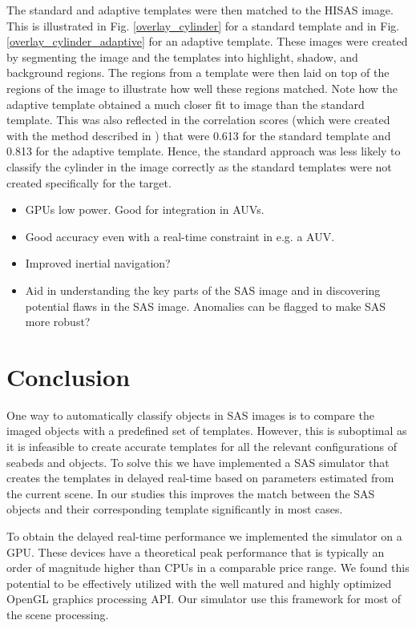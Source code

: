 The standard and adaptive templates were then matched to the HISAS image. This is illustrated in Fig. \ref{overlay_cylinder} for a standard template and in Fig. \ref{overlay_cylinder_adaptive} for an adaptive template. These images were created by segmenting the image and the templates into highlight, shadow, and background regions. The regions from a template were then laid on top of the regions of the image to illustrate how well these regions matched. Note how the adaptive template obtained a much closer fit to image than the standard template. This was also reflected in the correlation scores (which were created with the method described in \cite{Midelfart2010}) that were 0.613 for the standard template and 0.813 for the adaptive template. Hence, the standard approach was less likely to classify the cylinder in the image correctly as the standard templates were not created specifically for the target.

\begin{itemize}
\item GPUs low power. Good for integration in AUVs.
\item Good accuracy even with a real-time constraint in e.g. a AUV.
\item Improved inertial navigation?
\item Aid in understanding the key parts of the SAS image and in discovering potential flaws in the SAS image. Anomalies can be flagged to make SAS more robust?
\end{itemize}


\section{Conclusion}\label{conclusion}

One way to automatically classify objects in SAS images is to compare the imaged objects with a predefined set of templates. However, this is suboptimal as it is infeasible to create accurate templates for all the relevant configurations of seabeds and objects. To solve this we have implemented a SAS simulator that creates the templates in delayed real-time based on parameters estimated from the current scene. In our studies this improves the match between the SAS objects and their corresponding template significantly in most cases.

To obtain the delayed real-time performance we implemented the simulator on a GPU. These devices have a theoretical peak performance that is typically an order of magnitude higher than CPUs in a comparable price range. We found this potential to be effectively utilized with the well matured and highly optimized OpenGL graphics processing API. Our simulator use this framework for most of the scene processing.


